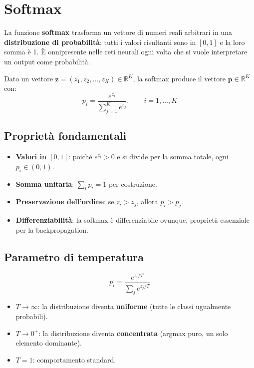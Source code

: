 \documentclass[
  11pt,
]{article}
\begin{document}
\appendix

\section{Softmax}
\label{app:softmax}

La funzione \textbf{softmax} trasforma un vettore di numeri reali arbitrari in una \textbf{distribuzione di probabilità}: tutti i valori risultanti sono in $[0,1]$ e la loro somma è 1. È onnipresente nelle reti neurali ogni volta che si vuole interpretare un output come probabilità.

\begin{formulabox}[title={\textbf{Definizione della Softmax}}]
Dato un vettore $\mathbf{z} = (z_1, z_2, \ldots, z_K) \in \mathbb{R}^K$, la softmax produce il vettore $\mathbf{p} \in \mathbb{R}^K$ con:
\[
p_i = \frac{e^{z_i}}{\sum_{j=1}^{K} e^{z_j}}, \qquad i = 1, \ldots, K
\]
\end{formulabox}

\subsection{Proprietà fondamentali}

\begin{itemize}
  \item \textbf{Valori in $[0,1]$}: poiché $e^{z_i} > 0$ e si divide per la somma totale, ogni $p_i \in (0,1)$.
  \item \textbf{Somma unitaria}: $\sum_i p_i = 1$ per costruzione.
  \item \textbf{Preservazione dell'ordine}: se $z_i > z_j$, allora $p_i > p_j$.
  \item \textbf{Differenziabilità}: la softmax è differenziabile ovunque, proprietà essenziale per la backpropagation.
\end{itemize}

\subsection{Parametro di temperatura}

\begin{formulabox}[title={\textbf{Softmax con temperatura $T$}}]
\[
p_i = \frac{e^{z_i / T}}{\sum_{j} e^{z_j / T}}
\]
\end{formulabox}

\begin{itemize}
  \item $T \to \infty$: la distribuzione diventa \textbf{uniforme} (tutte le classi ugualmente probabili).
  \item $T \to 0^+$: la distribuzione diventa \textbf{concentrata} (argmax puro, un solo elemento dominante).
  \item $T = 1$: comportamento standard.
\end{itemize}
\end{document}
